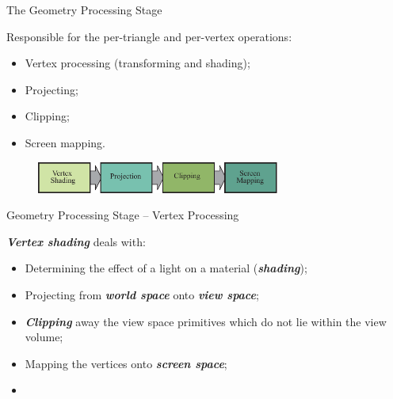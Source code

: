 \documentclass{beamer}
\newcommand{\emphbf}[1]{\textbf{\emph{#1}}}
\begin{document}
\begin{frame}{The Geometry Processing Stage}

	Responsible for the per-triangle and per-vertex operations:

	\begin{itemize}
		\item Vertex processing (transforming and shading);
		\item Projecting;
		\item Clipping;
		\item Screen mapping.
	\end{itemize}

	\vskip 1cm

	\begin{figure}[t]
		\includegraphics[width=8cm]{geometry-pipeline}
		\centering
	\end{figure}

\end{frame}

\begin{frame}{Geometry Processing Stage -- Vertex Processing}

	\emphbf{Vertex shading} deals with:

	\begin{itemize}
		\item Determining the effect of a light on a material (\emphbf{shading});
		\item Projecting from \emphbf{world space} onto \emphbf{view space};
		\item \emphbf{Clipping} away the view space primitives which do not lie within the view volume;
		\item Mapping the vertices onto \emphbf{screen space};
	\end{itemize}

	\vskip 1cm

	\begin{itemize}
		\item
	\end{itemize}

\end{frame}
\end{document}
